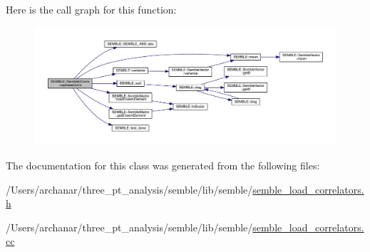 Here is the call graph for this function\+:
\nopagebreak
\begin{figure}[H]
\begin{center}
\leavevmode
\includegraphics[width=350pt]{d4/d35/classSEMBLE_1_1SembleCCorrs_a8a6ab4bd80f866d566c8a62ec53d5a53_cgraph}
\end{center}
\end{figure}


The documentation for this class was generated from the following files\+:\begin{DoxyCompactItemize}
\item 
/\+Users/archanar/three\+\_\+pt\+\_\+analysis/semble/lib/semble/\mbox{\hyperlink{semble__load__correlators_8h}{semble\+\_\+load\+\_\+correlators.\+h}}\item 
/\+Users/archanar/three\+\_\+pt\+\_\+analysis/semble/lib/semble/\mbox{\hyperlink{semble__load__correlators_8cc}{semble\+\_\+load\+\_\+correlators.\+cc}}\end{DoxyCompactItemize}
